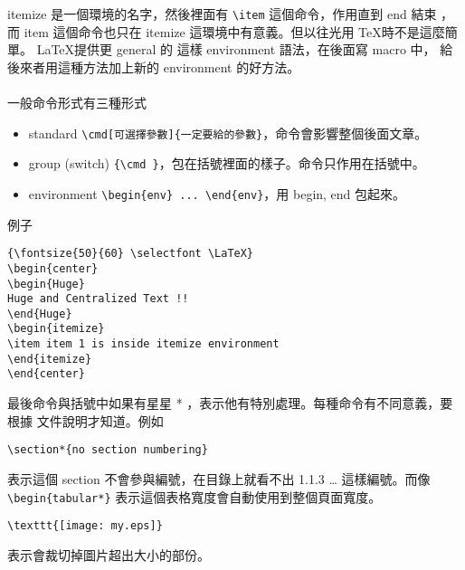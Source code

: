 itemize 是一個環境的名字，然後裡面有 \verb=\item= 這個命令，作用直到 end 結束
，而 item 這個命令也只在 itemize 這環境中有意義。但以往光用 \TeX 時不是這麼簡單。
\LaTeX 提供更 general 的 這樣 environment 語法，在後面寫 macro 中，
給後來者用這種方法加上新的 environment 的好方法。
\\\\
一般命令形式有三種形式
\begin{itemize}
\item standard \verb=\cmd[可選擇參數]{一定要給的參數}=，命令會影響整個後面文章。
\item group (switch) \verb={\cmd }=，包在括號裡面的樣子。命令只作用在括號中。
\item environment \verb=\begin{env} ... \end{env}=，用 begin, end 包起來。
\end{itemize}
例子
\begin{verbatim}
{\fontsize{50}{60} \selectfont \LaTeX}
\begin{center}
\begin{Huge}
Huge and Centralized Text !!
\end{Huge}
\begin{itemize}
\item item 1 is inside itemize environment
\end{itemize}
\end{center}
\end{verbatim}
最後命令與括號中如果有星星 * ，表示他有特別處理。每種命令有不同意義，要根據
文件說明才知道。例如
\begin{verbatim}
\section*{no section numbering}
\end{verbatim}表示這個 section 不會參與編號，在目錄上就看不出 1.1.3 \dots
這樣編號。而像 
\verb=\begin{tabular*}= 表示這個表格寬度會自動使用到整個頁面寬度。
\begin{verbatim}
\texttt{[image: my.eps]}
\end{verbatim}表示會裁切掉圖片超出大小的部份。


